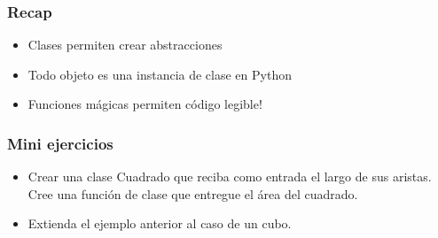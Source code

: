 \documentclass[14pt,aspectratio=169,xcolor=dvipsnames]{beamer}
\begin{document}
\begin{frame}\frametitle{Recap}
    \begin{itemize}
        \item Clases permiten crear abstracciones
        \item Todo objeto es una instancia de clase en Python
        \item Funciones mágicas permiten código legible!
    \end{itemize}
\end{frame}
\begin{frame}
    \maketitle
\end{frame}
\begin{frame}[noframenumbering]\frametitle{Mini ejercicios}
    \begin{itemize}
        \item Crear una clase Cuadrado que reciba como entrada el largo de sus aristas. Cree una función de clase que entregue el área del cuadrado.
        \item Extienda el ejemplo anterior al caso de un cubo.
    \end{itemize}
\end{frame}
\end{document}
